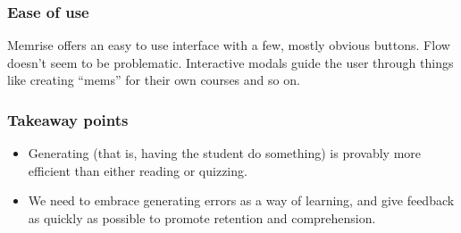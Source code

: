 \subsubsection{Ease of use}

Memrise offers an easy to use interface with a few, mostly obvious buttons. 
Flow doesn't seem to be problematic. Interactive modals guide the user through 
things like creating ``mems'' for their own courses and so on.

\subsubsection{Takeaway points}

\begin{itemize}
\item Generating (that is, having the student do something) is provably more
  efficient than either reading or quizzing.
\item We need to embrace generating errors as a way of learning, and give feedback
  as quickly as possible to promote retention and comprehension.
\end{itemize}

